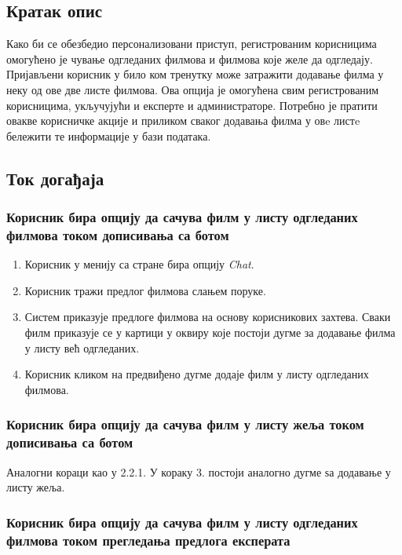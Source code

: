 \subsection{Кратак опис}

Како би се обезбедио персонализовани приступ, регистрованим корисницима омогућено је чување одгледаних
филмова и филмова које желе да одгледају. Пријављени корисник у било ком тренутку може затражити додавање филма у
неку од ове две листе филмова. Ова опција је омогућена свим регистрованим корисницима, укључујући и експерте 
и администраторе. Потребно је пратити овакве корисничке акције и приликом сваког додавања филма у овe листe бележити те информације у бази података.

\subsection{Ток догађаја}

\subsubsection{Корисник бира опцију да сачува филм у листу одгледаних филмова током дописивања са ботом}

\begin{enumerate}
    \item Корисник у менију са стране бира опцију \textit{Chat}.
    \item Корисник тражи предлог филмова слањем поруке.
    \item Систем приказује предлоге филмова на основу корисникових захтева. Сваки филм приказује се у картици 
    у оквиру које постоји дугме за додавање филма у листу већ одгледаних.
    \item Корисник кликом на предвиђено дугме додаје филм у листу одгледаних филмова.
\end{enumerate}

\subsubsection{Корисник бира опцију да сачува филм у листу жеља током дописивања са ботом}
Аналогни кораци као у 2.2.1. У кораку 3. постоји аналогно дугме ѕа додавање у листу жеља.

\subsubsection{Корисник бира опцију да сачува филм у листу одгледаних филмова током прегледања предлога експерата}

